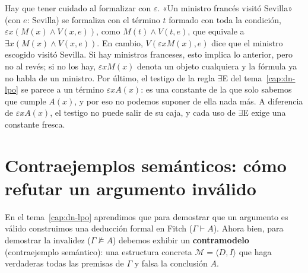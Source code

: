 Hay que tener cuidado al formalizar con $\varepsilon$. «Un ministro francés visitó Sevilla» (con $e$: Sevilla) se formaliza con el término $t$ formado con toda la condición, $\varepsilon x (M(x) \land V(x, e))$, como $M(t) \land V(t, e)$, que equivale a $\exists x (M(x) \land V(x, e))$. En cambio, $V(\varepsilon x M(x), e)$ dice que el ministro escogido visitó Sevilla. Si hay ministros franceses, esto implica lo anterior, pero no al revés; si no los hay, $\varepsilon x M(x)$ denota un objeto cualquiera y la fórmula ya no habla de un ministro. Por último, el testigo de la regla $\exists$E del tema~\ref{cap:dn-lpo} se parece a un término $\varepsilon x A(x)$: es una constante de la que solo sabemos que cumple $A(x)$, y por eso no podemos suponer de ella nada más. A diferencia de $\varepsilon x A(x)$, el testigo no puede salir de su caja, y cada uso de $\exists$E exige una constante fresca.

\section{Contraejemplos semánticos: cómo refutar un argumento inválido}

En el tema~\ref{cap:dn-lpo} aprendimos que para demostrar que un
argumento es válido construimos una deducción formal en Fitch ($\Gamma
\vdash A$). Ahora bien, para demostrar la invalidez
($\Gamma\not\models A$) debemos exhibir un \textbf{contramodelo} (contraejemplo semántico): una estructura concreta $\mathcal{M} = \langle D, I \rangle$ que haga verdaderas todas las premisas de $\Gamma$ y falsa la conclusión $A$.


